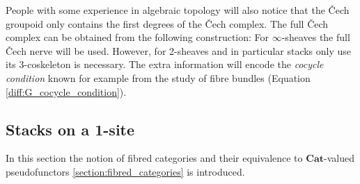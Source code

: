     People with some experience in algebraic topology will also notice that the \v{C}ech groupoid only contains the first degrees of the \v{C}ech complex. The full \v{C}ech complex can be obtained from the following construction:
    For $\infty$-sheaves the full \v{C}ech nerve will be used. However, for 2-sheaves and in particular stacks only use its 3-coskeleton is necessary. The extra information will encode the \textit{cocycle condition} known for example from the study of fibre bundles (Equation \eqref{diff:G_cocycle_condition}).

\subsection{Stacks on a 1-site}

    In this section the notion of fibred categories and their equivalence to $\mathbf{Cat}$-valued pseudofunctors \ref{section:fibred_categories} is introduced.

